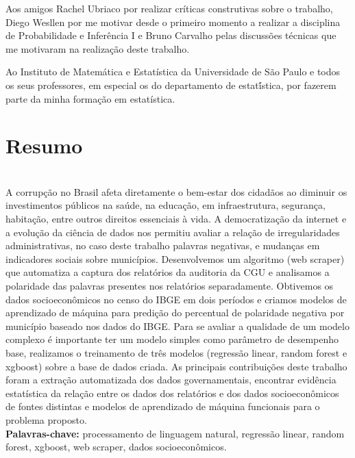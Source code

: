 \documentclass[12pt,twoside,a4paper]{book}
\begin{document}
Aos amigos Rachel Ubriaco por realizar críticas construtivas sobre o trabalho, Diego Wesllen por me motivar desde o primeiro momento a realizar a disciplina de Probabilidade e Inferência I e Bruno Carvalho pelas discussões técnicas que me motivaram na realização deste trabalho.

Ao Instituto de Matemática e Estatística da Universidade de São Paulo e todos os seus professores, em especial os do departamento de estatí́stica, por fazerem parte da minha formação em estatística.


\chapter*{Resumo}

\\

A corrupção no Brasil afeta diretamente o bem-estar dos cidadãos ao diminuir os investimentos públicos na saúde, na educação, em infraestrutura, segurança, habitação, entre outros direitos essenciais à vida. A democratização da internet e a evolução da ciência de dados nos permitiu avaliar a relação de irregularidades administrativas, no caso deste trabalho palavras negativas, e mudanças em indicadores sociais sobre municípios. Desenvolvemos um algoritmo (web scraper) que automatiza a captura dos relatórios da auditoria da CGU e analisamos a polaridade das palavras presentes nos relatórios separadamente. Obtivemos os dados socioeconômicos no censo do IBGE em dois períodos e criamos modelos de aprendizado de máquina para predição do percentual de polaridade negativa por município baseado nos dados do IBGE. Para se avaliar a qualidade de um modelo complexo é importante ter um modelo simples como parâmetro de desempenho base, realizamos o treinamento de três modelos (regressão linear, random forest e xgboost) sobre a base de dados criada. As principais contribuições deste trabalho foram a extração automatizada dos dados governamentais, encontrar evidência estatística da relação entre os dados dos relatórios e dos dados socioeconômicos de fontes distintas e modelos de aprendizado de máquina funcionais para o problema proposto.
\\

\noindent \textbf{Palavras-chave:} processamento de linguagem natural, regressão linear, random forest, xgboost, web scraper, dados socioeconômicos.
\end{document}
